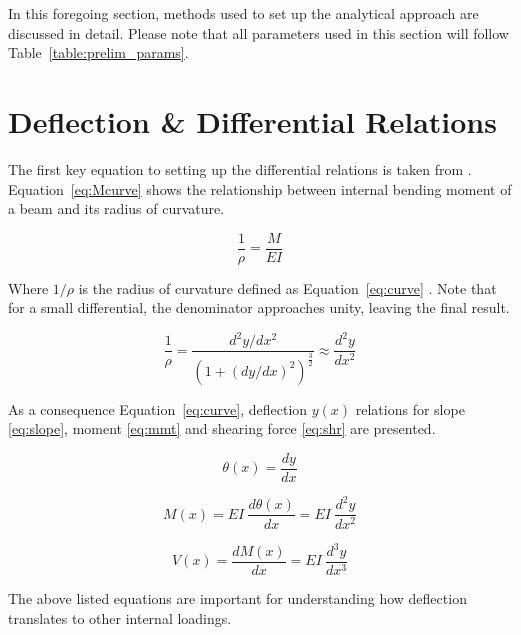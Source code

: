 \label{chapt:prelim}

In this foregoing section, methods used to set up the analytical approach are discussed in detail. Please note that all parameters used in this section will follow Table~\ref{table:prelim_params}.

\section{Deflection \& Differential Relations}

The first key equation to setting up the differential relations is taken from \cite{nisbett2014shigley}. Equation~\ref{eq:Mcurve} shows the relationship between internal bending moment of a beam and its radius of curvature. 

\begin{equation}
	\label{eq:Mcurve}
	\frac{1}{\rho}=\frac{M}{EI}
\end{equation}

Where $1/\rho$ is the radius of curvature defined as Equation~\ref{eq:curve} \cite{nisbett2014shigley}. Note that for a small differential, the denominator approaches unity, leaving the final result.

\begin{equation}
	\label{eq:curve}
	\frac{1}{\rho}=\frac{d^2y/dx^2}{\left( 1 +(dy/dx)^2 \right)^\frac{3}{2}} \approx \frac{d^2y}{dx^2}
\end{equation}

As a consequence Equation~\ref{eq:curve}, deflection $y(x)$ relations for slope \ref{eq:slope}, moment \ref{eq:mmt} and shearing force \ref{eq:shr} are presented\cite{nisbett2014shigley}.

\begin{equation}
	\label{eq:slope}
	\theta(x) = \frac{dy}{dx}
\end{equation}

\begin{equation}
	\label{eq:mmt}
	M(x) = EI\ \frac{d\theta(x)}{dx} = EI\ \frac{d^2y}{dx^2}
\end{equation}

\begin{equation}
	\label{eq:shr}
	V(x) = \frac{dM(x)}{dx} = EI\ \frac{d^3y}{dx^3}
\end{equation}

The above listed equations are important for understanding how deflection translates to other internal loadings.\\

